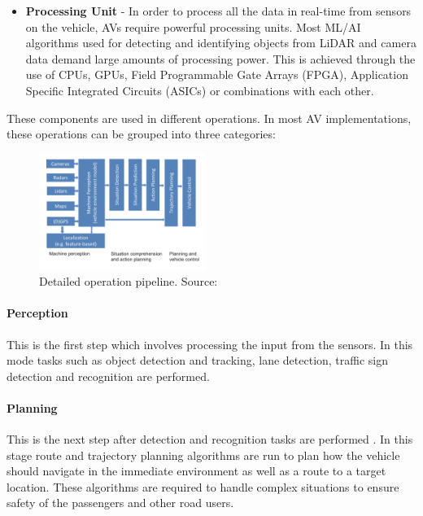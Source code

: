\begin{itemize}
	\item \textbf{Processing Unit} - In order to process all the data in real-time from sensors on the vehicle, AVs require powerful processing units. Most ML/AI algorithms used for detecting and identifying objects from LiDAR and camera data demand large amounts of processing power. This is achieved through the use of CPUs, GPUs, Field Programmable Gate Arrays (FPGA)\cite{brown2012field}, Application Specific Integrated Circuits (ASICs)\cite{smith1997application} or combinations with each other. 

\end{itemize}




These components are used in different operations. In most AV implementations, these operations can be grouped into three categories:

\begin{figure}
	\centering
	\includegraphics[width=0.48\textwidth]{images/operations}
	\caption{Detailed operation pipeline. Source:\cite{dietmayer2016predicting}}
\end{figure}

\paragraph{Perception}This is the first step which involves processing the input from the sensors. In this mode tasks such as object detection and tracking, lane detection, traffic sign detection and recognition are performed.
\paragraph{Planning}This is the next step after detection and recognition tasks are performed . In this stage route and trajectory planning algorithms are run to plan how the vehicle should navigate in the immediate environment as well as a route to a target location. These algorithms are required to handle complex situations to ensure safety of the passengers and other road users. 

